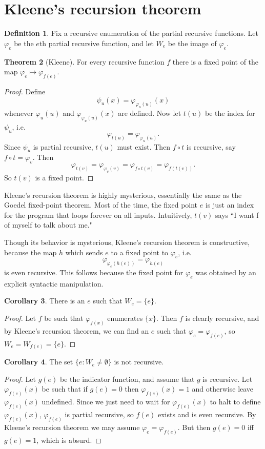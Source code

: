 \documentclass[12pt]{report}
\theoremstyle{definition}
\newtheorem{theorem}{Theorem}[chapter]
\newtheorem{corollary}[theorem]{Corollary}
\newtheorem{definition}[theorem]{Definition}
\begin{document}
\section{Kleene's recursion theorem}
\begin{definition}
Fix a recursive enumeration of the partial recursive functions. Let $\varphi_e$ be the $e$th partial recursive function, and let $W_e$ be the image of $\varphi_e$.
\end{definition}
\begin{theorem}[Kleene]
For every recursive function $f$ there is a fixed point of the map $\varphi_e \mapsto \varphi_{f(e)}$.
\end{theorem}
\begin{proof}
Define
$$\psi_u(x) = \varphi_{\varphi_u(u)}(x)$$
whenever $\varphi_u(u)$ and $\varphi_{\varphi_u(u)}(x)$ are defined. Now let $t(u)$ be the index for $\psi_u$, i.e.
$$\varphi_{t(u)} = \varphi_{\varphi_u(u)}.$$
Since $\psi_u$ is partial recursive, $t(u)$ must exist. Then $f \circ t$ is recursive, say $f \circ t = \varphi_v$. Then
$$\varphi_{t(v)} = \varphi_{\varphi_v(v)} = \varphi_{f \circ t(v)} = \varphi_{f(t(v))}.$$
So $t(v)$ is a fixed point.
\end{proof}
Kleene's recursion theorem is highly mysterious, essentially the same as the Goedel fixed-point theorem.
Most of the time, the fixed point $e$ is just an index for the program that loops forever on all inputs.
Intuitively, $t(v)$ says ``I want f of myself to talk about me."

Though its behavior is mysterious, Kleene's recursion theorem is constructive, because the map $h$ which sends $e$ to a fixed point to $\varphi_e$, i.e.
$$\varphi_{\varphi_e(h(e))} = \varphi_{h(e)}$$
is even recursive. This follows because the fixed point for $\varphi_e$ was obtained by an explicit syntactic manipulation.

\begin{corollary}
There is an $e$ such that $W_e = \{e\}$.
\end{corollary}
\begin{proof}
Let $f$ be such that $\varphi_{f(x)}$ enumerates $\{x\}$. Then $f$ is clearly recursive, and by Kleene's recursion theorem, we can find an $e$ such that $\varphi_e = \varphi_{f(e)}$, so $W_e = W_{f(e)} = \{e\}$.
\end{proof}

\begin{corollary}
The set $\{e: W_e \neq \emptyset\}$ is not recursive.
\end{corollary}
\begin{proof}
Let $g(e)$ be the indicator function, and assume that $g$ is recursive. Let $\varphi_{f(e)}(x)$ be such that if $g(e) = 0$ then $\varphi_{f(e)}(x) = 1$ and otherwise leave $\varphi_{f(e)}(x)$ undefined.
Since we just need to wait for $\varphi_{f(e)}(x)$ to halt to define $\varphi_{f(e)}(x)$, $\varphi_{f(e)}$ is partial recursive, so $f(e)$ exists and is even recursive.
By Kleene's recursion theorem we may assume $\varphi_e = \varphi_{f(e)}$. But then $g(e) = 0$ iff $g(e) = 1$, which is absurd.
\end{proof}
\end{document}
